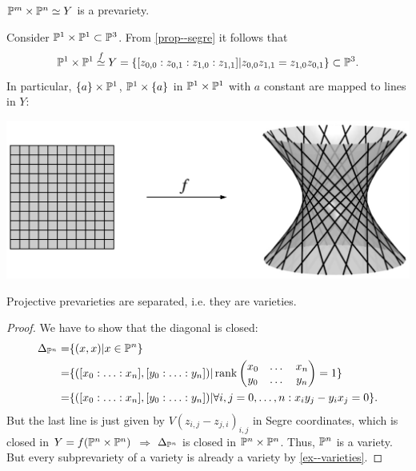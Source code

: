 \documentclass[a4paper,11pt]{article}
\begin{document}
			\begin{cor}
				$\P^m\times\P^n\simeq Y$ is a prevariety.
			\end{cor}

			\begin{eg}
				Consider $\P^1\times\P^1\subset\P^3$. From \autoref{prop--segre} it follows that
				\begin{equation*}
					\P^1\times\P^1\overset{f}{\simeq} Y=\{[z_{0,0}:z_{0,1}:z_{1,0}:z_{1,1}]|z_{0,0}z_{1,1}=z_{1,0}z_{0,1}\}\subset\P^3.
				\end{equation*}
				In particular,  $\{a\}\times\P^1$, $\P^1\times\{a\}$ in $\P^1\times\P^1$ with $a$ constant are mapped to lines in $Y$:
				\begin{center}
					\includegraphics[width=.6\textwidth]{hyperbola.pdf}
				\end{center}
			\end{eg}

			\begin{cor}
				Projective prevarieties are separated, i.e. they are varieties.
			\end{cor}
			\begin{proof}
				We have to show that the diagonal is closed:
				\begin{align*}
					\Delta_{\P^n}=&\{(x,x)|x\in\P^n\}\\
					=&\{([x_0:\ldots:x_n],[y_0:\ldots:y_n])|\rank\begin{pmatrix}
						x_0 & \dots & x_n\\ y_0 & \dots & y_n
					\end{pmatrix}=1\}\\
					=&\{([x_0:\ldots:x_n],[y_0:\ldots:y_n])|\forall i,j=0,\dots,n:x_iy_j-y_ix_j=0\}.
				\end{align*}
				But the last line is just given by $V(z_{i,j}-z_{j,i})_{i,j}$ in Segre coordinates, which is closed in $Y=f(\P^n\times\P^n)$ $\Longrightarrow$ $\Delta_{\P^n}$ is closed in $\P^n\times\P^n$. Thus, $\P^n$ is a variety. But every subprevariety of a variety is already a variety by \autoref{ex--varieties}.
			\end{proof}
\end{document}
